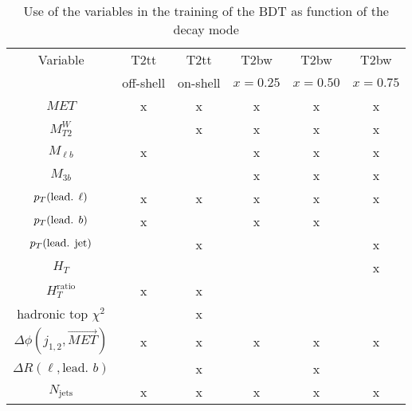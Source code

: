             \begin{table}[h!]
                \begin{center}
                    \begin{tabular}{|c|cc|ccc|}
                        
                        \hline
                        Variable                            & T2tt      & T2tt      & T2bw      & T2bw      & T2bw      \\
                                                            & off-shell & on-shell  & $x=0.25$  & $x=0.50$  & $x=0.75$  \\
                        \hline
                        $MET$                               &     x     &     x     &     x     &     x     &     x     \\ 
                        $M_{T2}^W$                          &           &     x     &     x     &     x     &     x     \\
                        $M_{\ell b}$                        &     x     &           &     x     &     x     &     x     \\
                        $M_{3 b}$                           &           &           &     x     &     x     &     x     \\
                        $p_T(\text{lead. } \ell)$           &     x     &     x     &     x     &     x     &     x     \\   
                        $p_T(\text{lead. } b)$              &     x     &           &     x     &     x     &           \\
                        $p_T(\text{lead. jet})$             &           &     x     &           &           &     x     \\
                        $H_{T}$                             &           &           &           &           &     x     \\
                        $H_{T}^\text{ratio}$                &     x     &     x     &           &           &           \\   
                        hadronic top $\chi^2$               &           &     x     &           &           &           \\
                        $\Delta\phi(j_{1,2},\vec{MET})$     &     x     &     x     &     x     &     x     &     x     \\
                        $\Delta R( \ell, \text{lead. } b)$  &           &     x     &           &     x     &           \\
                        $N_\text{jets}$                     &     x     &     x     &     x     &     x     &     x     \\
                        \hline
                    \end{tabular}
                    \caption{Use of the variables in the training of the BDT as function of the decay mode}
                    \label{tab:BDTVariableUsage}
                \end{center}
            \end{table}

